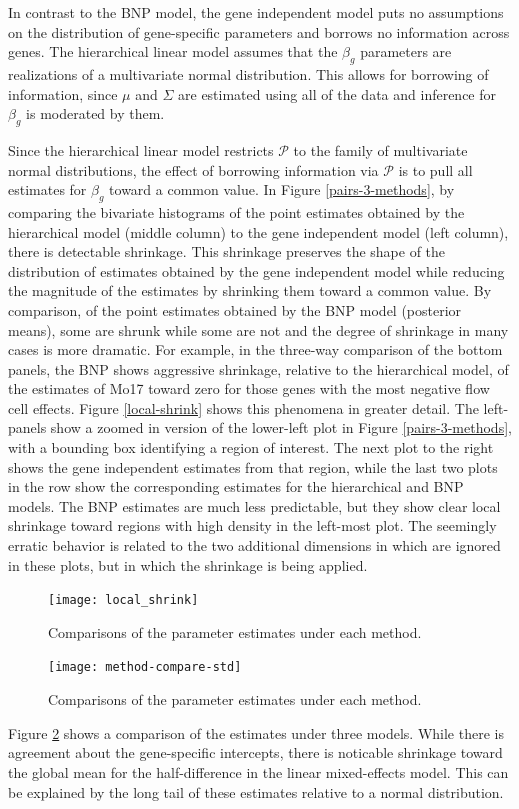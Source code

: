 {In contrast to the BNP model, the gene independent model puts no assumptions on the distribution of gene-specific parameters and borrows no information across genes. The hierarchical linear model assumes that the $\beta_g$ parameters are realizations of a multivariate normal distribution. This allows for borrowing of information, since $\mu$ and $\Sigma$ are estimated using all of the data and inference for $\beta_g$ is moderated by them.

Since the hierarchical linear model restricts $\mathcal{P}$ to the family of multivariate normal distributions, the effect of borrowing information via $\mathcal{P}$ is to pull all estimates for $\beta_g$ toward a common value. In Figure \ref{pairs-3-methods}, by comparing the bivariate histograms of the point estimates obtained by the hierarchical model (middle column) to the gene independent model (left column), there is detectable shrinkage. This shrinkage preserves the shape of the distribution of estimates obtained by the gene independent model while reducing the magnitude of the estimates by shrinking them toward a common value. By comparison, of the point estimates obtained by the BNP model (posterior means), some are shrunk while some are not and the degree of shrinkage in many cases is more dramatic. For example, in the three-way comparison of the bottom panels, the BNP shows aggressive shrinkage, relative to the hierarchical model, of the estimates of Mo17 toward zero for those genes with the most negative flow cell effects. Figure \ref{local-shrink} shows this phenomena in greater detail. The left-panels show a zoomed in version of the lower-left plot in Figure \ref{pairs-3-methods}, with a bounding box identifying a region of interest. The next plot to the right shows the gene independent estimates from that region, while the last two plots in the row show the corresponding estimates for the hierarchical and BNP models. The BNP estimates are much less predictable, but they show clear local shrinkage toward regions with high density in the left-most plot. The seemingly erratic behavior is related to the two additional dimensions in which are ignored in these plots, but in which the shrinkage is being applied.

\begin{figure}
\centering
\texttt{[image: local\_shrink]}
\caption{\small Comparisons of the parameter estimates under each method.}
\label{method-compare}
\end{figure}


\begin{figure}
\centering
\texttt{[image: method-compare-std]}
\caption{\small Comparisons of the parameter estimates under each method.}
\label{method-compare}
\end{figure}
Figure  \ref{method-compare} shows a comparison of the estimates under three models. While there is agreement about the gene-specific intercepts, there is noticable shrinkage toward the global mean for the half-difference in the linear mixed-effects model. This can be explained by the long tail of these estimates relative to a normal distribution.

}
